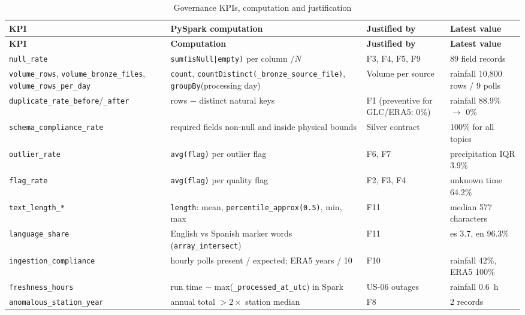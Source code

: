 \documentclass[11pt,a4paper]{article}
\begin{document}
\begin{small}\begin{longtable}{p{3.6cm}p{4.9cm}p{2.4cm}p{3.9cm}}
\caption{Governance KPIs, computation and justification}\\\toprule
\textbf{KPI} & \textbf{PySpark computation} & \textbf{Justified by} & \textbf{Latest value}\\\midrule\endfirsthead
\toprule\textbf{KPI} & \textbf{Computation} & \textbf{Justified by} & \textbf{Latest value}\\\midrule\endhead
\texttt{null\_\allowbreak{}rate} & \texttt{sum(\allowbreak{}isNull|empty)} per column $/N$ & F3, F4, F5, F9 & 89 field records\\
\texttt{volume\_\allowbreak{}rows}, \texttt{volume\_\allowbreak{}bronze\_\allowbreak{}files}, \texttt{volume\_\allowbreak{}rows\_\allowbreak{}per\_\allowbreak{}day} & \texttt{count}, \texttt{countDistinct(\allowbreak{}\_\allowbreak{}bronze\_\allowbreak{}source\_\allowbreak{}file)}, \texttt{groupBy}(processing day) & Volume per source & rainfall 10,800 rows / 9 polls\\
\texttt{duplicate\_\allowbreak{}rate\_\allowbreak{}before}/\texttt{\_\allowbreak{}after} & rows $-$ distinct natural keys & F1 (preventive for GLC/ERA5: 0\%) & rainfall 88.9\% $\to$ 0\%\\
\texttt{schema\_\allowbreak{}compliance\_\allowbreak{}rate} & required fields non-null and inside physical bounds & Silver contract & 100\% for all topics\\
\texttt{outlier\_\allowbreak{}rate} & \texttt{avg(\allowbreak{}flag)} per outlier flag & F6, F7 & precipitation IQR 3.9\%\\
\texttt{flag\_\allowbreak{}rate} & \texttt{avg(\allowbreak{}flag)} per quality flag & F2, F3, F4 & unknown time 64.2\%\\
\texttt{text\_\allowbreak{}length\_\allowbreak{}*} & \texttt{length}: mean, \texttt{percentile\_\allowbreak{}approx(\allowbreak{}0.\allowbreak{}5)}, min, max & F11 & median 577 characters\\
\texttt{language\_\allowbreak{}share} & English vs Spanish marker words (\texttt{array\_\allowbreak{}intersect}) & F11 & es 3.7, en 96.3\%\\
\texttt{ingestion\_\allowbreak{}compliance} & hourly polls present / expected; ERA5 years / 10 & F10 & rainfall 42\%, ERA5 100\%\\
\texttt{freshness\_\allowbreak{}hours} & run time $-$ max(\texttt{\_\allowbreak{}processed\_\allowbreak{}at\_\allowbreak{}utc}) in Spark & US-06 outages & rainfall 0.6~h\\
\texttt{anomalous\_\allowbreak{}station\_\allowbreak{}year} & annual total $> 2\times$ station median & F8 & 2 records\\
\bottomrule\end{longtable}\end{small}
\end{document}
